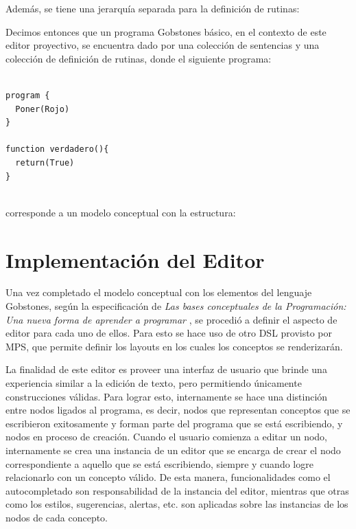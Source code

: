 \bigskip

Además, se tiene una jerarquía separada para la definición de rutinas:

\centertree{
  [RoutineDeclaration 
    [ProcedureDeclaration] 
    [FunctionDeclaration]
  ]
}


Decimos entonces que un programa Gobstones básico, en el contexto de este editor proyectivo, se encuentra dado por una colección de sentencias y una colección de definición de rutinas, donde el siguiente programa:

\begin{lstlisting}[frame=single] 

program {
  Poner(Rojo)
}

function verdadero(){
  return(True)
}
    
\end{lstlisting}

\noindent corresponde a un modelo conceptual con la estructura:



\section{Implementación del Editor}\label{editor}

Una vez completado el modelo conceptual con los elementos del lenguaje Gobstones, según la especificación de \textit{Las bases conceptuales de la Programación: Una nueva forma de aprender a programar} \cite{Gobstones}, se procedió a definir el aspecto de editor para cada uno de ellos. Para esto se hace uso de otro DSL provisto por MPS, que permite definir los layouts en los cuales los conceptos se renderizarán.

La finalidad de este editor es proveer una interfaz de usuario que brinde una experiencia similar a la edición de texto, pero permitiendo únicamente construcciones válidas. Para lograr esto, internamente se hace una distinción entre nodos ligados al programa, es decir, nodos que representan conceptos que se escribieron exitosamente y forman parte del programa que se está escribiendo, y nodos en proceso de creación. 
Cuando el usuario comienza a editar un nodo, internamente se crea una instancia de un editor que se encarga de crear el nodo correspondiente a aquello que se está escribiendo, siempre y cuando logre relacionarlo con un concepto válido. De esta manera, funcionalidades como el autocompletado son responsabilidad de la instancia del editor, mientras que otras como los estilos, sugerencias, alertas, etc. son aplicadas sobre las instancias de los nodos de cada concepto.


